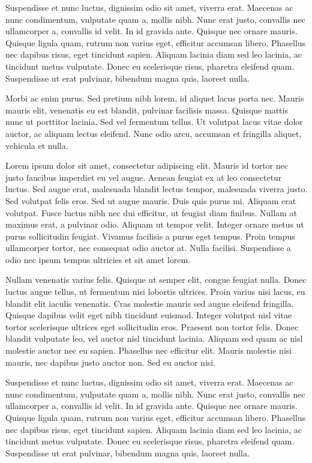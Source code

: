 \documentclass[AMA,STIX2COL,Linenumberson]{MRM}
\begin{document}
Suspendisse et nunc luctus, dignissim odio sit amet, viverra erat. Maecenas ac nunc condimentum, vulputate quam a, mollis nibh. Nunc erat justo, convallis nec ullamcorper a, convallis id velit. In id gravida ante. Quisque nec ornare mauris. Quisque ligula quam, rutrum non varius eget, efficitur accumsan libero. Phasellus nec dapibus risus, eget tincidunt sapien. Aliquam lacinia diam sed leo lacinia, ac tincidunt metus vulputate. Donec eu scelerisque risus, pharetra eleifend quam. Suspendisse ut erat pulvinar, bibendum magna quis, laoreet nulla.

Morbi ac enim purus. Sed pretium nibh lorem, id aliquet lacus porta nec. Mauris mauris elit, venenatis eu est blandit, pulvinar facilisis massa. Quisque mattis nunc ut porttitor lacinia. Sed vel fermentum tellus. Ut volutpat lacus vitae dolor auctor, ac aliquam lectus eleifend. Nunc odio arcu, accumsan et fringilla aliquet, vehicula et nulla.

Lorem ipsum dolor sit amet, consectetur adipiscing elit. Mauris id tortor nec justo faucibus imperdiet eu vel augue. Aenean feugiat ex at leo consectetur luctus. Sed augue erat, malesuada blandit lectus tempor, malesuada viverra justo. Sed volutpat felis eros. Sed ut augue mauris. Duis quis purus mi. Aliquam erat volutpat. Fusce luctus nibh nec dui efficitur, ut feugiat diam finibus. Nullam at maximus erat, a pulvinar odio. Aliquam ut tempor velit. Integer ornare metus ut purus sollicitudin feugiat. Vivamus facilisis a purus eget tempus. Proin tempus ullamcorper tortor, nec consequat odio auctor at. Nulla facilisi. Suspendisse a odio nec ipsum tempus ultricies et sit amet lorem.

Nullam venenatis varius felis. Quisque ut semper elit, congue feugiat nulla. Donec luctus augue tellus, ut fermentum nisi lobortis ultrices. Proin varius nisi lacus, eu blandit elit iaculis venenatis. Cras molestie mauris sed augue eleifend fringilla. Quisque dapibus velit eget nibh tincidunt euismod. Integer volutpat nisl vitae tortor scelerisque ultrices eget sollicitudin eros. Praesent non tortor felis. Donec blandit vulputate leo, vel auctor nisl tincidunt lacinia. Aliquam sed quam ac nisl molestie auctor nec eu sapien. Phasellus nec efficitur elit. Mauris molestie nisi mauris, nec dapibus justo auctor non. Sed eu auctor nisi.

Suspendisse et nunc luctus, dignissim odio sit amet, viverra erat. Maecenas ac nunc condimentum, vulputate quam a, mollis nibh. Nunc erat justo, convallis nec ullamcorper a, convallis id velit. In id gravida ante. Quisque nec ornare mauris. Quisque ligula quam, rutrum non varius eget, efficitur accumsan libero. Phasellus nec dapibus risus, eget tincidunt sapien. Aliquam lacinia diam sed leo lacinia, ac tincidunt metus vulputate. Donec eu scelerisque risus, pharetra eleifend quam. Suspendisse ut erat pulvinar, bibendum magna quis, laoreet nulla.
\end{document}
